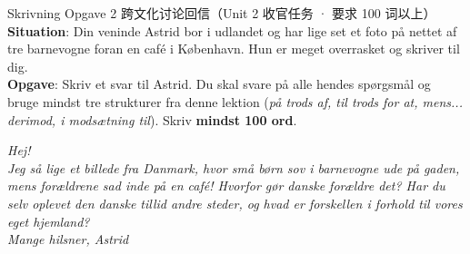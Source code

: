 \begin{emailbox}{Skrivning Opgave 2 跨文化讨论回信（Unit 2 收官任务 · 要求 100 词以上）}
\textbf{Situation}: Din veninde Astrid bor i udlandet og har lige set et foto på nettet af tre barnevogne foran en café i København. Hun er meget overrasket og skriver til dig.\\
\textbf{Opgave}: Skriv et svar til Astrid. Du skal svare på alle hendes spørgsmål og bruge mindst tre strukturer fra denne lektion (\textit{på trods af, til trods for at, mens... derimod, i modsætning til}). Skriv \textbf{mindst 100 ord}.

\vspace{0.3em}
\textit{Hej!\\
Jeg så lige et billede fra Danmark, hvor små børn sov i barnevogne ude på gaden, mens forældrene sad inde på en café! Hvorfor gør danske forældre det? Har du selv oplevet den danske tillid andre steder, og hvad er forskellen i forhold til vores eget hjemland?\\
Mange hilsner, Astrid}
\end{emailbox}

